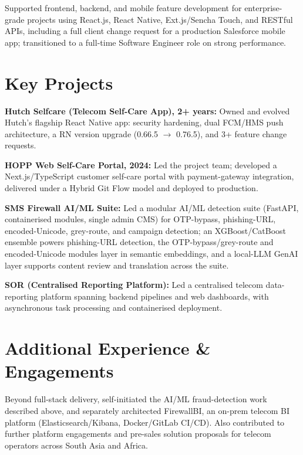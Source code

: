 \documentclass[10.5pt]{article}
\begin{document}
\begin{cvitems}
  \item Supported frontend, backend, and mobile feature development for enterprise-grade projects using React.js, React Native, Ext.js/Sencha Touch, and RESTful APIs, including a full client change request for a production Salesforce mobile app; transitioned to a full-time Software Engineer role on strong performance.
\end{cvitems}

\section*{Key Projects}
\begin{cvitems}
  \item \textbf{Hutch Selfcare (Telecom Self-Care App), 2+ years:} Owned and evolved Hutch's flagship React Native app: security hardening, dual FCM/HMS push architecture, a RN version upgrade (0.66.5 $\rightarrow$ 0.76.5), and 3+ feature change requests.
  \item \textbf{HOPP Web Self-Care Portal, 2024:} Led the project team; developed a Next.js/TypeScript customer self-care portal with payment-gateway integration, delivered under a Hybrid Git Flow model and deployed to production.
  \item \textbf{SMS Firewall AI/ML Suite:} Led a modular AI/ML detection suite (FastAPI, containerised modules, single admin CMS) for OTP-bypass, phishing-URL, encoded-Unicode, grey-route, and campaign detection; an XGBoost/CatBoost ensemble powers phishing-URL detection, the OTP-bypass/grey-route and encoded-Unicode modules layer in semantic embeddings, and a local-LLM GenAI layer supports content review and translation across the suite.
  \item \textbf{SOR (Centralised Reporting Platform):} Led a centralised telecom data-reporting platform spanning backend pipelines and web dashboards, with asynchronous task processing and containerised deployment.
\end{cvitems}

\section*{Additional Experience \& Engagements}
Beyond full-stack delivery, self-initiated the AI/ML fraud-detection work described above, and separately architected FirewallBI, an on-prem telecom BI platform (Elasticsearch/Kibana, Docker/GitLab CI/CD). Also contributed to further platform engagements and pre-sales solution proposals for telecom operators across South Asia and Africa.
\end{document}
